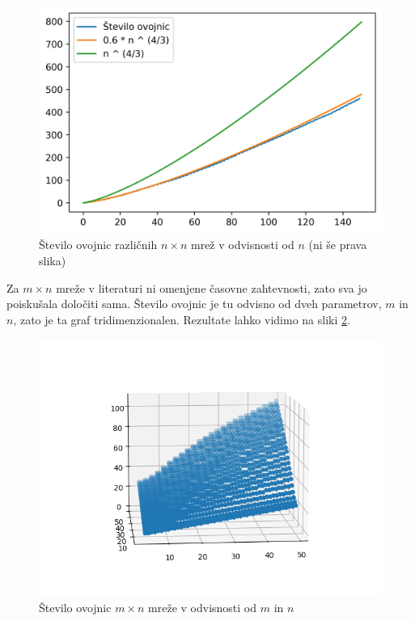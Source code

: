 \documentclass[a4paper]{article}
\begin{document}
\begin{figure}[!h]
	\centering
	\caption{Število ovojnic različnih $n \times n$ mrež v odvisnosti od $n$ (ni še prava slika)}
	\label{fig:st_ovojnic}
	\includegraphics[scale=0.6]{slike/st_ovojnic.jpg}
\end{figure}

\newpage
Za $m \times n$ mreže v literaturi ni omenjene časovne zahtevnosti, zato sva jo poiskušala določiti sama. Število ovojnic je tu odvisno od dveh parametrov, $m$ in $n$, zato je ta graf 
tridimenzionalen. Rezultate lahko vidimo na sliki \ref{fig:3d}.

\begin{figure}[!h]
	\centering
	\caption{Število ovojnic $m \times n$ mreže v odvisnosti od $m$ in $n$}
	\label{fig:3d}
	\includegraphics[scale=0.6]{slike/mxn_3d.png}
\end{figure}
\end{document}
